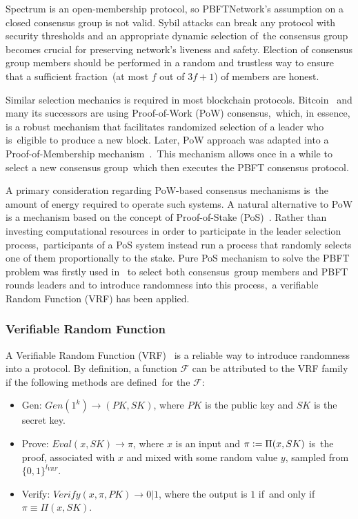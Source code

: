 Spectrum is an open-membership protocol, so PBFTNetwork's assumption on a closed consensus group is not valid.
Sybil attacks can break any protocol with security thresholds and an appropriate dynamic selection of\
the consensus group becomes crucial for preserving network's liveness and safety.
Election of consensus group members should be performed in a random and trustless way to ensure that a sufficient fraction\
(at most $f$ out of ${3 f + 1}$) of members are honest.

Similar selection mechanics is required in most blockchain protocols.
Bitcoin~\cite{nakamoto2009bitcoin} and many its successors are using Proof-of-Work (PoW) consensus,\
which, in essence, is a robust mechanism that facilitates randomized selection of a leader who is\
eligible to produce a new block.
Later, PoW approach was adapted into a Proof-of-Membership mechanism~\cite{kokoriskogias2016enhancing}.\
This mechanism allows once in a while to select a new consensus group\
which then executes the PBFT consensus protocol.

A primary consideration regarding PoW-based consensus mechanisms is\
the amount of energy required to operate such systems.
A natural alternative to PoW is a mechanism based on the concept of Proof-of-Stake (PoS)~\cite{King2012PPCoinPC}.
Rather than investing computational resources in order to participate in the leader selection process,\
participants of a PoS system instead run a process that randomly selects one of them proportionally to the stake.
Pure PoS mechanism to solve the PBFT problem was firstly used in~\cite{cryptoeprint:2017/454} to select both consensus\
group members and PBFT rounds leaders and to introduce randomness into this process,\
a verifiable Random Function (VRF) has been applied.

\subsubsection{Verifiable Random Function}

A Verifiable Random Function (VRF)~\cite{Micali1999} is a reliable way to introduce randomness into a protocol.
By definition, a function $\mathcal{F}$ can be attributed to the VRF family if the following methods are defined\
for the $\mathcal{F}$:
\begin{itemize}
    \item Gen: ${Gen(1^k) \rightarrow (PK, SK)}$, where $PK$ is the public key and $SK$ is the secret key.
    \item Prove: ${Eval(x, SK) \rightarrow \pi}$, where $x$ is an input and $\pi \vcentcolon= \Pi(x, SK)$ is\
    the proof, associated with $x$ and mixed with some random value $y$, sampled from $\{0,1\}^{l_{VRF}}$.
    \item Verify: ${Verify(x, \pi, PK) \rightarrow 0 | 1}$, where the output is $1$ if\
    and only if ${\pi \equiv \Pi(x, SK)}$.
\end{itemize}

